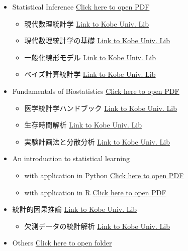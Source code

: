 \documentclass[
]{book}
\providecommand{\tightlist}{%
  \setlength{\itemsep}{0pt}\setlength{\parskip}{0pt}}
\begin{document}
\begin{itemize}
\tightlist
\item
  Statistical Inference \href{Textbook/Casella_Berger_Statistical_Inference.pdf}{Click here to open PDF}

  \begin{itemize}
  \tightlist
  \item
    現代数理統計学 \href{https://elib.maruzen.co.jp/elib/html/BookDetail/Id/3000105174;jsessionid=77611339D268556CDFB560D03E30F354?0}{Link to Kobe Univ. Lib}
  \item
    現代数理統計学の基礎 \href{https://elib.maruzen.co.jp/elib/html/BookDetail/Id/3000050917?2}{Link to Kobe Univ. Lib}
  \item
    一般化線形モデル \href{https://elib.maruzen.co.jp/elib/html/BookDetail/Id/3000031957?19}{Link to Kobe Univ. Lib}
  \item
    ベイズ計算統計学 \href{https://elib.maruzen.co.jp/elib/html/BookDetail/Id/3000027079?21}{Link to Kobe Univ. Lib}
  \end{itemize}
\item
  Fundamentals of Biostatistics \href{Textbook/Fundamentals\%20of\%20Biostatistics\%20(8th\%20Edition).pdf}{Click here to open PDF}

  \begin{itemize}
  \tightlist
  \item
    医学統計学ハンドブック \href{https://elib.maruzen.co.jp/elib/html/BookDetail/Id/3000068387?3}{Link to Kobe Univ. Lib}
  \item
    生存時間解析 \href{https://elib.maruzen.co.jp/elib/html/BookDetail/Id/3000117213?16}{Link to Kobe Univ. Lib}
  \item
    実験計画法と分散分析 \href{https://elib.maruzen.co.jp/elib/html/BookDetail/Id/3000027080?23}{Link to Kobe Univ. Lib}
  \end{itemize}
\item
  An introduction to statistical learning

  \begin{itemize}
  \tightlist
  \item
    with application in Python \href{Textbook/ISLP_pyhton.pdf}{Click here to open PDF}
  \item
    with application in R \href{Textbook/ISLR_R.pdf}{Click here to open PDF}
  \end{itemize}
\item
  統計的因果推論 \href{https://elib.maruzen.co.jp/elib/html/BookDetail/Id/3000034381?17}{Link to Kobe Univ. Lib}

  \begin{itemize}
  \tightlist
  \item
    欠測データの統計解析 \href{https://elib.maruzen.co.jp/elib/html/BookDetail/Id/3000031956?18}{Link to Kobe Univ. Lib}
  \end{itemize}
\item
  Others \href{Textbook/.}{Click here to open folder}
\end{itemize}
\end{document}
